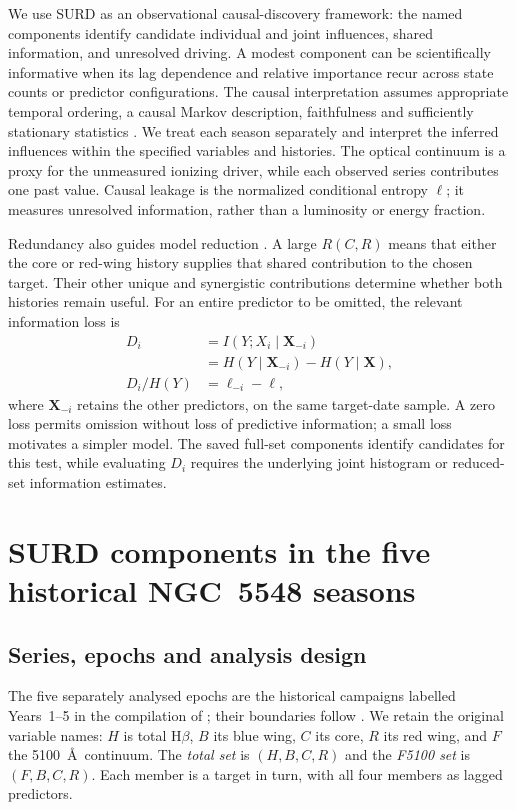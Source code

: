 \documentclass[fleqn,usenatbib]{mnras}
\begin{document}
We use SURD as an observational causal-discovery framework: the named components identify candidate individual and joint influences, shared information, and unresolved driving. A modest component can be scientifically informative when its lag dependence and relative importance recur across state counts or predictor configurations. The causal interpretation assumes appropriate temporal ordering, a causal Markov description, faithfulness and sufficiently stationary statistics \citep{MartinezSanchez2025Thesis}. We treat each season separately and interpret the inferred influences within the specified variables and histories. The optical continuum is a proxy for the unmeasured ionizing driver, while each observed series contributes one past value. Causal leakage is the normalized conditional entropy $\ell$; it measures unresolved information, rather than a luminosity or energy fraction.

Redundancy also guides model reduction \citep[section~4.10]{MartinezSanchez2025Thesis}. A large $R(C,R)$ means that either the core or red-wing history supplies that shared contribution to the chosen target. Their other unique and synergistic contributions determine whether both histories remain useful. For an entire predictor to be omitted, the relevant information loss is
\begin{equation}
\begin{aligned}
D_i&=I(Y;X_i\mid\mathbf X_{-i})\\
&=H(Y\mid\mathbf X_{-i})-H(Y\mid\mathbf X),\\
D_i/H(Y)&=\ell_{-i}-\ell,
\end{aligned}
\label{eq:predictor_omission}
\end{equation}
where $\mathbf X_{-i}$ retains the other predictors, on the same target-date sample. A zero loss permits omission without loss of predictive information; a small loss motivates a simpler model. The saved full-set components identify candidates for this test, while evaluating $D_i$ requires the underlying joint histogram or reduced-set information estimates.

\section{SURD components in the five historical NGC~5548 seasons}
\label{sec:epoch_surd_results}
\subsection{Series, epochs and analysis design}
The five separately analysed epochs are the historical campaigns labelled Years~1--5 in the compilation of \citet{Lu2022}; their boundaries follow \citet{Peterson2004ApJ}. We retain the original variable names: $H$ is total H$\beta$, $B$ its blue wing, $C$ its core, $R$ its red wing, and $F$ the 5100~\AA\ continuum. The \emph{total set} is $(H,B,C,R)$ and the \emph{F5100 set} is $(F,B,C,R)$. Each member is a target in turn, with all four members as lagged predictors.
\end{document}
